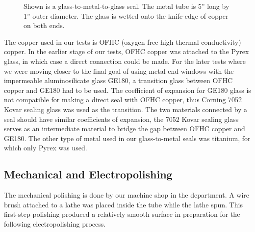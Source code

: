 \begin{figure}[t!]
	\centering
	\caption{{Shown is a glass-to-metal-to-glass seal. The metal tube is 5'' long by 1'' outer diameter. The glass is wetted onto the knife-edge of copper on both ends.}}
	\label{metal_tube}
\end{figure}

The copper used in our tests is OFHC (oxygen-free high thermal conductivity) copper. In the earlier stage of our tests, OFHC copper was attached to the Pyrex glass, in which case a direct connection could be made. For the later tests where we were moving closer to the final goal of using metal end windows with the impermeable aluminosilicate glass GE180, a transition glass between OFHC copper and GE180 had to be used. The coefficient of expansion for GE180 glass is not compatible for making a direct seal with OFHC copper, thus Corning 7052 Kovar sealing glass was used as the transition. The two materials connected by a seal should have similar coefficients of expansion, the 7052 Kovar sealing glass serves as an intermediate material to bridge the gap between OFHC copper and GE180. The other type of metal used in our glass-to-metal seals was titanium, for which only Pyrex was used.

\subsection{Mechanical and Electropolishing}

The mechanical polishing is done by our machine shop in the department. A wire brush attached to a lathe was placed inside the tube while the lathe spun. This first-step polishing produced a relatively smooth surface in preparation for the following electropolishing process.

